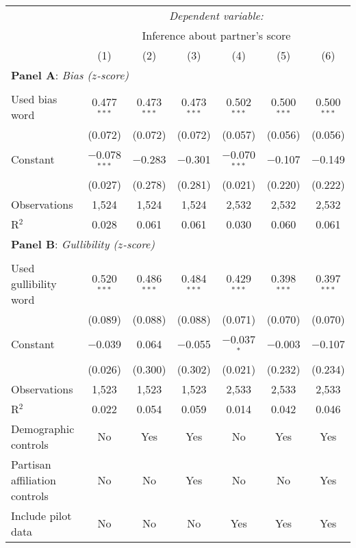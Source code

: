 \begin{table}[!htbp] \centering 
  \label{t:1-validation}
\begin{threeparttable}
\begin{tabular}{@{\hspace{5pt}}l@{\hspace{5pt}}cccccc} 
\toprule 
 & \multicolumn{6}{c}{\textit{Dependent variable:}} \\ 
\cmidrule(rr){2-7} 
 & \multicolumn{6}{c}{Inference about partner's score} \\ 
 & (1) & (2) & (3) & (4) & (5) & (6)\\ 
\midrule  
\midrule
\multicolumn{7}{l}{\textbf{Panel A}: \textit{Bias ($z$-score)}} \\
\midrule
\\[-2.1ex] Used bias word & 0.477$^{***}$ & 0.473$^{***}$ & 0.473$^{***}$ & 0.502$^{***}$ & 0.500$^{***}$ & 0.500$^{***}$ \\ 
  & (0.072) & (0.072) & (0.072) & (0.057) & (0.056) & (0.056) \\ 
 \addlinespace 
 Constant & $-$0.078$^{***}$ & $-$0.283 & $-$0.301 & $-$0.070$^{***}$ & $-$0.107 & $-$0.149 \\ 
  & (0.027) & (0.278) & (0.281) & (0.021) & (0.220) & (0.222) \\ 
 \addlinespace 
\midrule  
Observations & 1,524 & 1,524 & 1,524 & 2,532 & 2,532 & 2,532 \\ 
R$^{2}$ & 0.028 & 0.061 & 0.061 & 0.030 & 0.060 & 0.061 \\ 
\midrule
\midrule
\multicolumn{7}{l}{\textbf{Panel B}: \textit{Gullibility ($z$-score)}} \\
\midrule
\\[-2.1ex] Used gullibility word & 0.520$^{***}$ & 0.486$^{***}$ & 0.484$^{***}$ & 0.429$^{***}$ & 0.398$^{***}$ & 0.397$^{***}$ \\ 
  & (0.089) & (0.088) & (0.088) & (0.071) & (0.070) & (0.070) \\ 
 \addlinespace 
 Constant & $-$0.039 & 0.064 & $-$0.055 & $-$0.037$^{*}$ & $-$0.003 & $-$0.107 \\ 
  & (0.026) & (0.300) & (0.302) & (0.021) & (0.232) & (0.234) \\ 
 \addlinespace 
\midrule  
Observations & 1,523 & 1,523 & 1,523 & 2,533 & 2,533 & 2,533 \\ 
R$^{2}$ & 0.022 & 0.054 & 0.059 & 0.014 & 0.042 & 0.046 \\ 
\midrule
\midrule
Demographic controls & No & Yes & Yes & No & Yes & Yes \\ 
Partisan affiliation controls & No & No & Yes & No & No & Yes \\ 
Include pilot data & No & No & No & Yes & Yes & Yes \\
\bottomrule 
\end{tabular} 
\end{threeparttable}
\end{table} 
